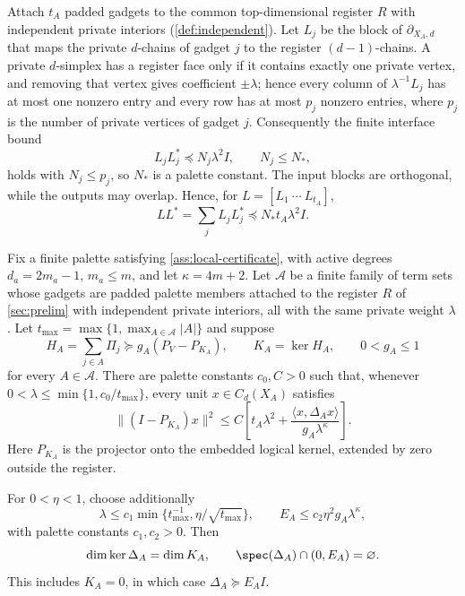 Attach \(t_A\) padded gadgets to the common top-dimensional register \(R\)
with independent private interiors (\cref{def:independent}).  Let \(L_j\) be
the block of \(\partial_{X_A,d}\) that maps the private \(d\)-chains of
gadget \(j\) to the register \((d-1)\)-chains.  A private \(d\)-simplex has a
register face only if it contains exactly one private vertex, and removing
that vertex gives coefficient \(\pm\lambda\); hence every column of
\(\lambda^{-1}L_j\) has at most one nonzero entry and every row has at most
\(p_j\) nonzero entries, where \(p_j\) is the number of private vertices of
gadget \(j\).  Consequently the finite interface bound
\begin{equation}
\label{eq:interface}
L_jL_j^*\preceq N_j\lambda^2I,\qquad N_j\le N_*,
\end{equation}
holds with \(N_j\le p_j\), so \(N_*\) is a palette constant.
The input blocks are orthogonal, while the outputs may overlap.  Hence, for
\(L=[L_1\ \cdots\ L_{t_A}]\),
\[
LL^*=\sum_jL_jL_j^*\preceq N_*t_A\lambda^2I.
\]

\begin{theorem}
\label{thm:transfer}
Fix a finite palette satisfying \cref{ass:local-certificate}, with active
degrees \(d_a=2m_a-1\), \(m_a\le m\), and let \(\kappa=4m+2\).  Let
\(\mathcal A\) be a finite family of term sets whose gadgets are padded
palette members attached to the register \(R\) of \cref{sec:prelim} with
independent private interiors, all with the same private weight \(\lambda\).
Let \(t_{\max}=\max\{1,\max_{A\in\mathcal A}|A|\}\) and suppose
\[
H_A=\sum_{j\in A}\Pi_j\succeq
g_A(P_V-P_{K_A}),\qquad K_A=\ker H_A,\qquad 0<g_A\le1
\]
for every \(A\in\mathcal A\).
There are palette constants \(c_0,C>0\) such that, whenever
\(0<\lambda\le\min\{1,c_0/t_{\max}\}\), every unit \(x\in C_d(X_A)\)
satisfies
\begin{equation}
\label{eq:transfer-bound}
\boxed{\;
\|(I-P_{K_A})x\|^2
\le C\left[t_A\lambda^2+
\frac{\langle x,\Delta_Ax\rangle}{g_A\lambda^\kappa}\right].\;}
\end{equation}
Here \(P_{K_A}\) is the projector onto the embedded logical kernel, extended
by zero outside the register.

For \(0<\eta<1\), choose additionally
\begin{equation}
\label{eq:lambda-E-choice}
\lambda\le c_1\min\{t_{\max}^{-1},\eta/\sqrt{t_{\max}}\},
\qquad E_A\le c_2\eta^2g_A\lambda^\kappa,
\end{equation}
with palette constants \(c_1,c_2>0\).  Then
\begin{equation}
\label{eq:kernel-gap-conclusion}
\dim\ker\Delta_A=\dim K_A,\qquad
\spec(\Delta_A)\cap(0,E_A)=\varnothing .
\end{equation}
This includes \(K_A=0\), in which case \(\Delta_A\succeq E_AI\).
\end{theorem}

